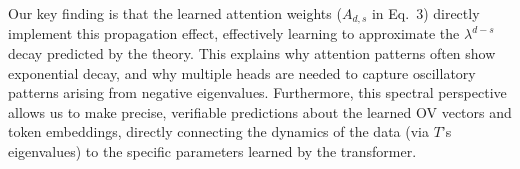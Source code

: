 \documentclass{article}
\theoremstyle{plain}
\theoremstyle{definition}
\theoremstyle{remark}
\begin{document}
Our key finding is that the learned attention weights ($A_{d,s}$ in Eq.~3) directly implement this propagation effect, effectively learning to approximate the $\lambda^{d-s}$ decay predicted by the theory. This explains why attention patterns often show exponential decay, and why multiple heads are needed to capture oscillatory patterns arising from negative eigenvalues. Furthermore, this spectral perspective allows us to make precise, verifiable predictions about the learned OV vectors and token embeddings, directly connecting the dynamics of the data (via $T$'s eigenvalues) to the specific parameters learned by the transformer.

\end{document}

